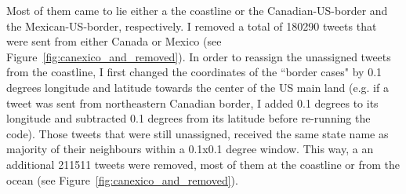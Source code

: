 \documentclass[11pt, a4paper]{report}\usepackage[]{graphicx}\usepackage[]{color}
\begin{document}
Most of them came to lie either a the coastline or the Canadian-US-border and the Mexican-US-border, respectively. I removed a total of 180290 tweets that were sent from either Canada or Mexico (see Figure~\ref{fig:canexico_and_removed}). In order to reassign the unassigned tweets from the coastline, I first changed the coordinates of the ``border cases" by 0.1 degrees longitude and latitude towards the center of the US main land (e.g. if a tweet was sent from northeastern Canadian border, I added 0.1 degrees to its longitude and subtracted 0.1 degrees from its latitude before re-running the code). Those tweets that were still unassigned, received the same state name as majority of their neighbours within a 0.1x0.1 degree window. This way, a an additional 211511 tweets were removed, most of them at the coastline or from the ocean (see Figure~\ref{fig:canexico_and_removed}).\newline
\end{document}
